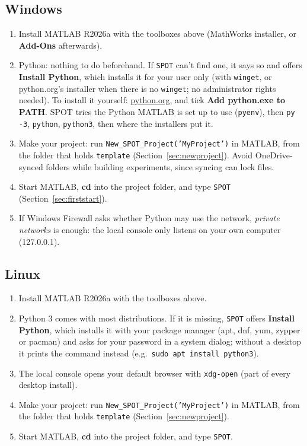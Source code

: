 \documentclass[11pt,a4paper]{article}
\newcommand{\ui}[1]{\textsf{\textbf{#1}}}
\newcommand{\pth}[1]{\texttt{#1}}
\newcommand{\fn}[1]{\texttt{#1}}
\begin{document}
\subsection{Windows}
\begin{enumerate}
  \item Install MATLAB R2026a with the toolboxes above (MathWorks installer, or \ui{Add-Ons} afterwards).
  \item Python: nothing to do beforehand. If \fn{SPOT} can't find one, it says so and offers \ui{Install Python}, which
        installs it for your user only (with \pth{winget}, or python.org's installer when there is no \pth{winget}; no
        administrator rights needed). To install it yourself: \href{https://www.python.org/downloads/}{python.org}, and
        tick \ui{Add python.exe to PATH}. SPOT tries the Python MATLAB is set up to use (\fn{pyenv}), then \fn{py -3},
        \fn{python}, \fn{python3}, then where the installers put it.
  \item Make your project: run \fn{New\_SPOT\_Project('MyProject')} in MATLAB, from the folder that holds \pth{template}
        (Section~\ref{sec:newproject}). Avoid OneDrive-synced folders while building experiments, since syncing can
        lock files.
  \item Start MATLAB, \ui{cd} into the project folder, and type \fn{SPOT} (Section~\ref{sec:firststart}).
  \item If Windows Firewall asks whether Python may use the network, \emph{private networks} is enough: the local
        console only listens on your own computer (127.0.0.1).
\end{enumerate}

\subsection{Linux}
\begin{enumerate}
  \item Install MATLAB R2026a with the toolboxes above.
  \item Python 3 comes with most distributions. If it is missing, \fn{SPOT} offers \ui{Install Python}, which installs
        it with your package manager (apt, dnf, yum, zypper or pacman) and asks for your password in a system dialog;
        without a desktop it prints the command instead (e.g.\ \pth{sudo apt install python3}).
  \item The local console opens your default browser with \pth{xdg-open} (part of every desktop install).
  \item Make your project: run \fn{New\_SPOT\_Project('MyProject')} in MATLAB, from the folder that holds \pth{template}
        (Section~\ref{sec:newproject}).
  \item Start MATLAB, \ui{cd} into the project folder, and type \fn{SPOT}.
\end{enumerate}
\end{document}
